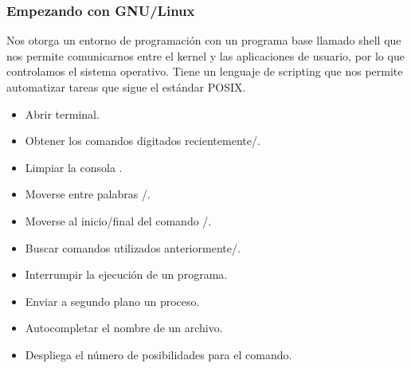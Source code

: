




\begin{frame}
	\frametitle{Empezando con GNU/Linux}
    Nos otorga un entorno de programación con un programa base llamado shell que nos permite comunicarnos entre el kernel y las aplicaciones de usuario, por lo que controlamos el sistema operativo.
    Tiene un lenguaje de scripting que nos permite automatizar tareas que sigue el estándar POSIX.

	\begin{itemize}
		\item Abrir terminal\quad{}.
        \item Obtener los comandos digitados recientemente\quad\keys{\arrowkeyup}/\keys{\arrowkeydown}.
        \item Limpiar la consola \quad{}.
        \item Moverse entre palabras \quad{}/.
        \item Moverse al inicio/final del comando \quad{}/.
        \item Buscar comandos utilizados anteriormente\quad{}/.
        \item Interrumpir la ejecución de un programa\quad{}.
        \item Enviar a segundo plano un proceso\quad{}.
        \item Autocompletar el nombre de un archivo\quad\keys{\tab}.
        \item Despliega el número de posibilidades para el comando\quad\keys{\tab+\tab}.
	\end{itemize}
\end{frame}

